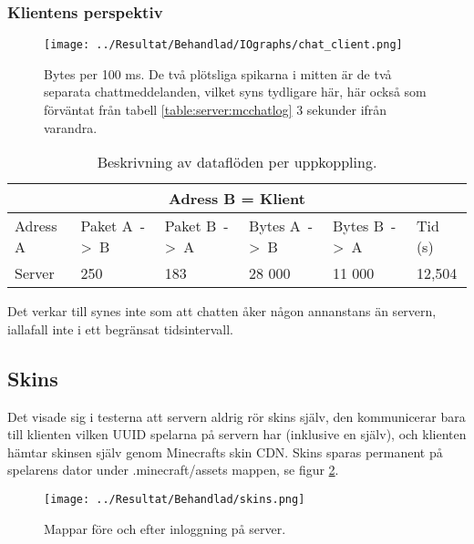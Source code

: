 \documentclass[journal,comsoc]{IEEEtran}
\begin{document}
\subsubsection{Klientens perspektiv}
\begin{figure} [H]
  \centering
  \texttt{[image: ../Resultat/Behandlad/IOgraphs/chat\_client.png]}
  \caption{Bytes per 100 ms. De två plötsliga spikarna i mitten är de två separata chattmeddelanden, vilket syns tydligare här, här också som förväntat från tabell \ref{table:server:mcchatlog} 3 sekunder ifrån varandra.}
  \label{fig:client:mcchat}
\end{figure}
\begin{table} [H]
  \begin{center}
    \label{table:client:mcchat}
    \begin{tabular}{ | m{1.5cm} |  m{1cm} | m{1cm}| m{1cm}|m{1cm}|m{0.75cm}| } 
      \hline
      \multicolumn{6}{|c|}{Adress B = Klient} \\
      \hline
      Adress A & Paket A~->~B & Paket B~->~A & Bytes A~->~B & Bytes B~->~A & Tid (s) \\
      \hline
      Server & 250 & 183 & 28 000 & 11 000  & 12,504 \\
      \hline 
    \end{tabular}
  \end{center}
  \caption{Beskrivning av dataflöden per uppkoppling.}
\end{table}
Det verkar till synes inte som att chatten åker någon annanstans än servern, iallafall inte i ett begränsat tidsintervall.

\subsection{Skins}
Det visade sig i testerna att servern aldrig rör skins själv, den kommunicerar bara till klienten vilken UUID spelarna på servern har (inklusive en själv), och klienten hämtar skinsen själv genom Minecrafts skin CDN. Skins sparas permanent på spelarens dator under .minecraft/assets mappen, se figur \ref{fig:skinfolder}.

\begin{figure} [H]
  \centering
  \texttt{[image: ../Resultat/Behandlad/skins.png]}
  \caption{Mappar före och efter inloggning på server.}
  \label{fig:skinfolder}
\end{figure}
\end{document}
